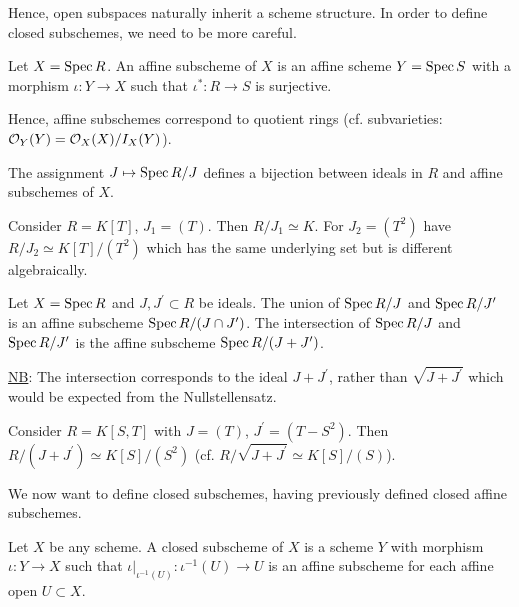 \documentclass[a4paper,11pt]{article}
\begin{document}
			Hence, open subspaces naturally inherit a scheme structure. In order to define closed subschemes, we need to be more careful.

			\begin{defi}
				Let $X=\operatorname{Spec} R$. An affine subscheme of $X$ is an affine scheme $Y=\operatorname{Spec} S$ with a morphism $\iota:Y\rightarrow X$ such that $\iota^\ast:R\rightarrow S$ is surjective.
			\end{defi}

			Hence, affine subschemes correspond to quotient rings (cf. subvarieties: $\mathcal{O}_Y(Y)=\mathcal{O}_X(X)/I_X(Y)$).

			\begin{prop}
				The assignment $J\mapsto\operatorname{Spec} R/J$ defines a bijection between ideals in $R$ and affine subschemes of $X$.
			\end{prop}

			\begin{eg}
				Consider $R=K[T]$, $J_1=(T)$. Then $R/J_1\simeq K$. For $J_2=(T^2)$ have $R/J_2\simeq K[T]/(T^2)$ which has the same underlying set but is different algebraically.
			\end{eg}

			\begin{defi}
				Let $X=\operatorname{Spec} R$ and $J,J^\prime\subset R$ be ideals. The union of $\operatorname{Spec} R/J$ and $\operatorname{Spec} R/J^\prime$ is an affine subscheme $\operatorname{Spec} R/(J\cap J^\prime)$. The intersection of $\operatorname{Spec} R/J$ and $\operatorname{Spec} R/J^\prime$ is the affine subscheme $\operatorname{Spec} R/(J+J^\prime)$.
			\end{defi}

			\noindent\underline{NB}: The intersection corresponds to the ideal $J+J^\prime$, rather than $\sqrt{J+J^\prime}$ which would be expected from the Nullstellensatz.

			\begin{eg}
				Consider $R=K[S,T]$ with $J=(T)$, $J^\prime=(T-S^2)$. Then $R/(J+J^\prime)\simeq K[S]/(S^2)$ (cf. $R/\sqrt{J+J^\prime}\simeq K[S]/(S)$).
			\end{eg}

			We now want to define closed subschemes, having previously defined closed affine subschemes.

			\begin{defi}
				Let $X$ be any scheme. A closed subscheme of $X$ is a scheme $Y$ with morphism $\iota:Y\rightarrow X$ such that $\iota|_{\iota^{-1}(U)}:\iota^{-1}(U)\rightarrow U$ is an affine subscheme for each affine open $U\subset X$.
			\end{defi}	 
\end{document}
